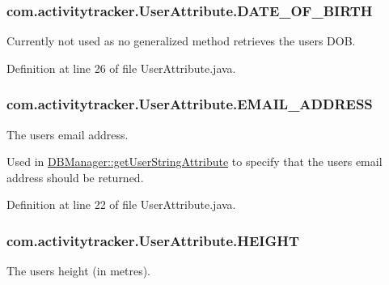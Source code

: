 \subsubsection[{\texorpdfstring{D\+A\+T\+E\+\_\+\+O\+F\+\_\+\+B\+I\+R\+TH}{DATE_OF_BIRTH}}]{\setlength{\rightskip}{0pt plus 5cm}com.\+activitytracker.\+User\+Attribute.\+D\+A\+T\+E\+\_\+\+O\+F\+\_\+\+B\+I\+R\+TH}\hypertarget{enumcom_1_1activitytracker_1_1_user_attribute_af3b77ceae76c5f1c46e6821dc98940ee}{}\label{enumcom_1_1activitytracker_1_1_user_attribute_af3b77ceae76c5f1c46e6821dc98940ee}
Currently not used as no generalized method retrieves the user\textquotesingle{}s D\+OB. 

Definition at line 26 of file User\+Attribute.\+java.

\subsubsection[{\texorpdfstring{E\+M\+A\+I\+L\+\_\+\+A\+D\+D\+R\+E\+SS}{EMAIL_ADDRESS}}]{\setlength{\rightskip}{0pt plus 5cm}com.\+activitytracker.\+User\+Attribute.\+E\+M\+A\+I\+L\+\_\+\+A\+D\+D\+R\+E\+SS}\hypertarget{enumcom_1_1activitytracker_1_1_user_attribute_a8b9fa2ebf911262dfa24c683ff2a3b9c}{}\label{enumcom_1_1activitytracker_1_1_user_attribute_a8b9fa2ebf911262dfa24c683ff2a3b9c}
The user\textquotesingle{}s email address.

Used in \hyperlink{classcom_1_1activitytracker_1_1_d_b_manager_a20f726c054d6c8a6fc3ce629d87f1114}{D\+B\+Manager\+::get\+User\+String\+Attribute} to specify that the user\textquotesingle{}s email address should be returned. 

Definition at line 22 of file User\+Attribute.\+java.

\subsubsection[{\texorpdfstring{H\+E\+I\+G\+HT}{HEIGHT}}]{\setlength{\rightskip}{0pt plus 5cm}com.\+activitytracker.\+User\+Attribute.\+H\+E\+I\+G\+HT}\hypertarget{enumcom_1_1activitytracker_1_1_user_attribute_a0a80ca5cce8eb4494c2128bd4291a5b7}{}\label{enumcom_1_1activitytracker_1_1_user_attribute_a0a80ca5cce8eb4494c2128bd4291a5b7}
The user\textquotesingle{}s height (in metres).

